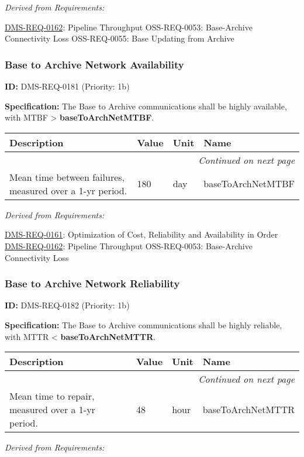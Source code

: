 \documentclass[SE,toc,lsstdraft]{lsstdoc}
\makeatletter
\newcommand{\paramname}[1]{\hspace{0pt}#1}
\newcommand{\unitname}[1]{\hspace{0pt}#1}
\newenvironment{parameters}[0]{%
\setlength\LTleft{0pt}
\setlength\LTright{\fill}
\begin{small}
\begin{longtable}[]{|p{0.49\textwidth}|l|p{0.6in}|p{1.70in}@{}|}

\hline \textbf{Description} & \textbf{Value} & \textbf{Unit} & \textbf{Name} \\ \hline
\endhead

\hline \multicolumn{4}{r}{\emph{Continued on next page}} \\
\endfoot

\hline\hline
\endlastfoot
}{%
\hline
\end{longtable}
\end{small}
}
\makeatother
\begin{document}
\emph{Derived from Requirements:}

\hyperref[DMS-REQ-0162]{DMS-REQ-0162}:
Pipeline Throughput \newline
OSS-REQ-0053:
Base-Archive Connectivity Loss \newline
OSS-REQ-0055:
Base Updating from Archive \newline

\subsubsection{Base to Archive Network Availability}

\label{DMS-REQ-0181}
\textbf{ID:} DMS-REQ-0181 (Priority: 1b)

\textbf{Specification: }The Base to Archive communications shall be highly available, with MTBF >  \textbf{baseToArchNetMTBF}.

\begin{parameters}
Mean time between failures, measured over a 1-yr period.
&
180
&
\unitname{%
day
}
&
\paramname{%
baseToArchNetMTBF
} \\\hline
\end{parameters}

\emph{Derived from Requirements:}

\hyperref[DMS-REQ-0161]{DMS-REQ-0161}:
Optimization of Cost, Reliability and Availability in Order \newline
\hyperref[DMS-REQ-0162]{DMS-REQ-0162}:
Pipeline Throughput \newline
OSS-REQ-0053:
Base-Archive Connectivity Loss \newline

\subsubsection{Base to Archive Network Reliability}

\label{DMS-REQ-0182}
\textbf{ID:} DMS-REQ-0182 (Priority: 1b)

\textbf{Specification:} The Base to Archive communications shall be highly reliable, with MTTR <  \textbf{baseToArchNetMTTR}.

\begin{parameters}
Mean time to repair, measured over a 1-yr period.
&
48
&
\unitname{%
hour
}
&
\paramname{%
baseToArchNetMTTR
} \\\hline
\end{parameters}

\emph{Derived from Requirements:}
\end{document}
